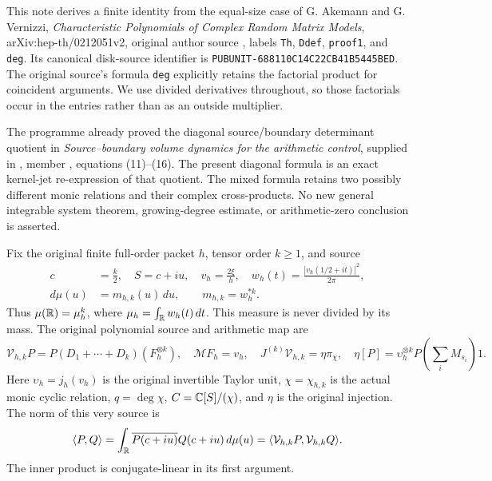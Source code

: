 This note derives a finite identity from the equal-size case of G. Akemann
and G. Vernizzi, \emph{Characteristic Polynomials of Complex Random Matrix
Models}, arXiv:hep-th/0212051v2, original author source
, labels \texttt{Th}, \texttt{Ddef},
\texttt{proof1}, and \texttt{deg}. Its canonical disk-source identifier is
\texttt{PUBUNIT-688110C14C22CB41B5445BED}. The original source's formula
\texttt{deg} explicitly retains the factorial product for coincident
arguments. We use divided derivatives throughout, so those factorials
occur in the entries rather than as an outside multiplier.

The programme already proved the diagonal source/boundary determinant
quotient in \emph{Source--boundary volume dynamics for the arithmetic
control}, supplied in ,
member , equations (11)--(16).
The present diagonal formula is an exact kernel-jet re-expression of
that quotient. The mixed formula retains two possibly different monic
relations and their complex cross-products. No new general integrable
system theorem, growing-degree estimate, or arithmetic-zero conclusion
is asserted.

Fix the original finite full-order packet \(h\), tensor order \(k\geq1\),
and source
\begin{equation}\label{mrfinite:eq:source}
\begin{aligned}
 c&=\frac{k}{2},\quad S=c+iu,\quad v_h=\frac{2\xi}{h},\quad
 w_h(t)=\frac{|v_h(1/2+it)|^2}{2\pi},\\
 d\mu(u)&=m_{h,k}(u)\,du,\qquad m_{h,k}=w_h^{*k}.
\end{aligned}
\end{equation}
Thus \(\mu(\mathbb R)=\mu_h^k\), where \(\mu_h=\int_\mathbb R w_h(t)\,dt\).
This measure is never divided by its mass.
The original polynomial source and arithmetic map are
\begin{equation}\label{mrfinite:eq:original-maps}
 \mathcal V_{h,k}P
   =P(D_1+\cdots+D_k)(F_h^{\otimes k}),\quad
 \mathcal M F_h=v_h,\quad
 J^{(k)}\mathcal V_{h,k}=\eta\pi_\chi,
 \quad
 \eta[P]=\upsilon_h^{\otimes k}
             P\!\left(\sum_iM_{s_i}\right)1.
\end{equation}
Here \(\upsilon_h=j_h(v_h)\) is the original invertible Taylor unit,
\(\chi=\chi_{h,k}\) is the actual monic cyclic relation,
\(q=\deg\chi\), \(C=\mathbb C[S]/(\chi)\), and \(\eta\) is the original
injection. The norm of this very source is
\begin{equation}\label{mrfinite:eq:inner}
 \langle P,Q\rangle
 =\int_\mathbb R\overline{P(c+iu)}Q(c+iu)\,d\mu(u)
 =\langle\mathcal V_{h,k}P,\mathcal V_{h,k}Q\rangle.
\end{equation}
The inner product is conjugate-linear in its first argument.

